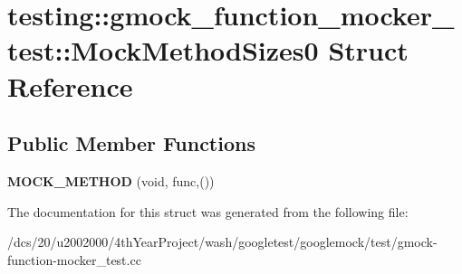 \hypertarget{structtesting_1_1gmock__function__mocker__test_1_1MockMethodSizes0}{}\section{testing\+:\+:gmock\+\_\+function\+\_\+mocker\+\_\+test\+:\+:Mock\+Method\+Sizes0 Struct Reference}
\label{structtesting_1_1gmock__function__mocker__test_1_1MockMethodSizes0}
\subsection*{Public Member Functions}
\begin{DoxyCompactItemize}
\item 
\mbox{\label{structtesting_1_1gmock__function__mocker__test_1_1MockMethodSizes0_ab38f39ad908e506f699b3cd8c1b9a218}} 
{\bfseries M\+O\+C\+K\+\_\+\+M\+E\+T\+H\+OD} (void, func,())
\end{DoxyCompactItemize}


The documentation for this struct was generated from the following file\+:\begin{DoxyCompactItemize}
\item 
/dcs/20/u2002000/4th\+Year\+Project/wash/googletest/googlemock/test/gmock-\/function-\/mocker\+\_\+test.\+cc\end{DoxyCompactItemize}
